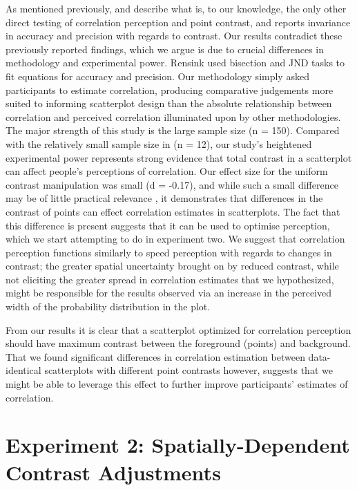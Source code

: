 \documentclass[preprint, 3p,
authoryear]{elsarticle} %
\begin{document}
As mentioned previously, \citet{rensink_2012} and \citet{rensink_2014}
describe what is, to our knowledge, the only other direct testing of
correlation perception and point contrast, and reports invariance in
accuracy and precision with regards to contrast. Our results contradict
these previously reported findings, which we argue is due to crucial
differences in methodology and experimental power. Rensink used
bisection and JND tasks to fit equations for accuracy and precision. Our
methodology simply asked participants to estimate correlation, producing
comparative judgements more suited to informing scatterplot design than
the absolute relationship between correlation and perceived correlation
illuminated upon by other methodologies. The major strength of this
study is the large sample size (n = 150). Compared with the relatively
small sample size in \citet{rensink_2014} (n = 12), our study's
heightened experimental power represents strong evidence that total
contrast in a scatterplot can affect people's perceptions of
correlation. Our effect size for the uniform contrast manipulation was
small (d = -0.17), and while such a small difference may be of little
practical relevance , it demonstrates that differences in the contrast
of points can effect correlation estimates in scatterplots. The fact
that this difference is present suggests that it can be used to optimise
perception, which we start attempting to do in experiment two. We
suggest that correlation perception functions similarly to speed
perception \citep{champion_2017} with regards to changes in contrast;
the greater spatial uncertainty brought on by reduced contrast, while
not eliciting the greater spread in correlation estimates that we
hypothesized, might be responsible for the results observed via an
increase in the perceived width of the probability distribution in the
plot.

From our results it is clear that a scatterplot optimized for
correlation perception should have maximum contrast between the
foreground (points) and background. That we found significant
differences in correlation estimation between data-identical
scatterplots with different point contrasts however, suggests that we
might be able to leverage this effect to further improve participants'
estimates of correlation.

\hypertarget{experiment-2-spatially-dependent-contrast-adjustments}{%
\section{Experiment 2: Spatially-Dependent Contrast
Adjustments}\label{experiment-2-spatially-dependent-contrast-adjustments}}
\end{document}
